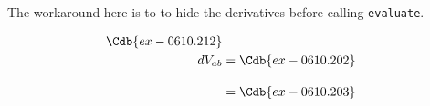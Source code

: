 \documentclass[12pt]{cdblatex}
\begin{document}
The workaround here is to to hide the derivatives before calling {\tt evaluate}.

\begin{align*}
   \Cdb{ex-0610.212}\\
   dV_{a b} &= \Cdb{ex-0610.202}\\[10pt]
            &= \Cdb{ex-0610.203}\\[10pt]
\end{align*}
\end{document}
